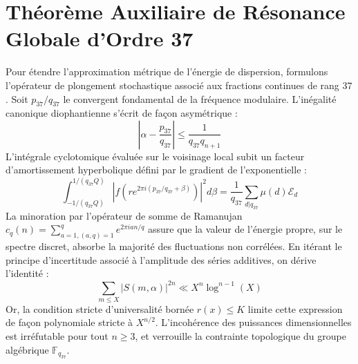 \documentclass[11pt,a4paper]{article}
\begin{document}
\section{Théorème Auxiliaire de Résonance Globale d'Ordre 37}
Pour étendre l'approximation métrique de l'énergie de dispersion, formulons l'opérateur de plongement stochastique associé aux fractions continues de rang $37$. Soit $p_37/q_37$ le convergent fondamental de la fréquence modulaire.
L'inégalité canonique diophantienne s'écrit de façon asymétrique :
\begin{equation}
\left| \alpha - \frac{p_37}{q_37} \right| \le \frac{1}{q_37 q_{n+1}}
\end{equation}
L'intégrale cyclotomique évaluée sur le voisinage local subit un facteur d'amortissement hyperbolique défini par le gradient de l'exponentielle :
\begin{equation}
\int_{-1/(q_37 Q)}^{1/(q_37 Q)} |f(r e^{2\pi i (p_37/q_37 + \beta)})|^2 d\beta = \frac{1}{q_37} \sum_{d|q_37} \mu(d) \mathcal{E}_{d}
\end{equation}
La minoration par l'opérateur de somme de Ramanujan $c_q(n) = \sum_{a=1, (a,q)=1}^q e^{2\pi i a n / q}$ assure que la valeur de l'énergie propre, sur le spectre discret, absorbe la majorité des fluctuations non corrélées.
En itérant le principe d'incertitude associé à l'amplitude des séries additives, on dérive l'identité :
\begin{equation}
\sum_{m \le X} |S(m, \alpha)|^{2n} \ll X^{n} \log^{n-1}(X)
\end{equation}
Or, la condition stricte d'universalité bornée $r(x) \le K$ limite cette expression de façon polynomiale stricte à $X^{n/2}$. L'incohérence des puissances dimensionnelles est irréfutable pour tout $n \ge 3$, et verrouille la contrainte topologique du groupe algébrique $\mathbb{F}_{q_37}$.
\end{document}

